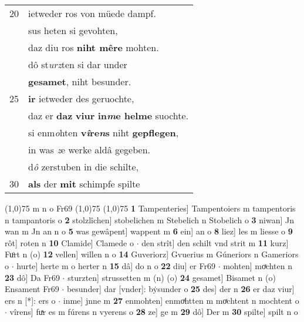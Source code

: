 \documentclass[8pt,a4paper,notitlepage]{article}
\begin{document}
\begin{table}[ht]
\begin{minipage}[t]{0.5\linewidth}
\begin{tabular}{rl}
20 & ietweder ros von müede dampf.\\ 
 & sus heten si gevohten,\\ 
 & daz diu ros \textbf{niht mêre} mohten.\\ 
 & dô st\textit{urz}ten si dar under\\ 
 & \textbf{gesamet}, niht besunder.\\ 
25 & \textbf{ir} ietweder des geruochte,\\ 
 & daz er \textbf{daz} \textbf{viur} \textbf{in\textit{m}e helme} suochte.\\ 
 & si enm\textit{o}hten \textbf{v\textit{î}re\textit{n}s} niht \textbf{gepflegen},\\ 
 & in was \textit{z}e werke aldâ gegeben.\\ 
 & d\textit{ô} zerstuben in die schilte,\\ 
30 & \textbf{als} der \textbf{mit} schimpfe spilte\\ 
\end{tabular}
\scriptsize
\line(1,0){75} \newline
m n o Fr69 \newline
\line(1,0){75} \newline
\newline
\line(1,0){75} \newline
\textbf{1} Tampenteries] Tampentoiers m tampentoris n tampantoris o \textbf{2} stolzlîchen] stobelichen m Stebelich n Stobelich o \textbf{3} niwan] Jn wan m Jn an n o \textbf{5} was gewâpent] wappent m \textbf{6} ein] an o \textbf{8} liez] les m liesse o \textbf{9} rôt] roten n \textbf{10} Clamide] Clamede o  $\cdot$ den strît] den schilt vnd strit m \textbf{11} kurz] Fuͦrt n (o) \textbf{12} vellen] willen n o \textbf{14} Guveriorz] Gvuerius m Gúneriors n Gameriors o  $\cdot$ hurte] herte m o herter n \textbf{15} dâ] do n o \textbf{22} diu] er Fr69  $\cdot$ mohten] moͯchten n \textbf{23} dô] Da Fr69  $\cdot$ sturzten] strussetten m (n) (o) \textbf{24} gesamet] Bisamet n (o) Ensament Fr69  $\cdot$ besunder] dar [vnder]: bẏsunder o \textbf{25} des] der n \textbf{26} er daz viur] ers n [*]: ers o  $\cdot$ inme] jnne m \textbf{27} enmohten] enmoͯhtten m moͯchtent n mochtent o  $\cdot$ vîrens] fuͯr es m fúrens n vyerens o \textbf{28} ze] ge m \textbf{29} dô] Der m \textbf{30} spilte] spilt n o \newline
\end{minipage}
\end{table}
\newpage
\end{document}
